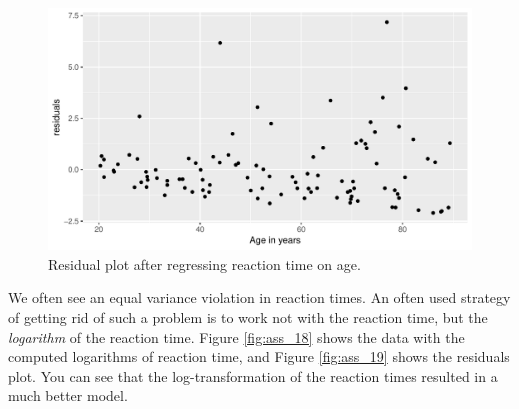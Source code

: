 \documentclass[]{book}\usepackage[]{graphicx}\usepackage[]{color}
\makeatletter
\def\maxwidth{ %
  \ifdim\Gin@nat@width>\linewidth
    \linewidth
  \else
    \Gin@nat@width
  \fi
}
\newenvironment{knitrout}{}{} %
\makeatother
\begin{document}
\begin{knitrout}
\color{fgcolor}\begin{figure}

{\centering \includegraphics[width=\maxwidth]{figure/ass_17-1} 

}

\caption[Residual plot after regressing reaction time on age]{Residual plot after regressing reaction time on age.}\label{fig:ass_17}
\end{figure}


\end{knitrout}



We often see an equal variance violation in reaction times. An often used strategy of getting rid of such a problem is to work not with the reaction time, but the \textit{logarithm} of the reaction time. Figure \ref{fig:ass_18} shows the data with the computed logarithms of reaction time, and Figure \ref{fig:ass_19} shows the residuals plot. You can see that the log-transformation of the reaction times resulted in a much better model. 
\end{document}
